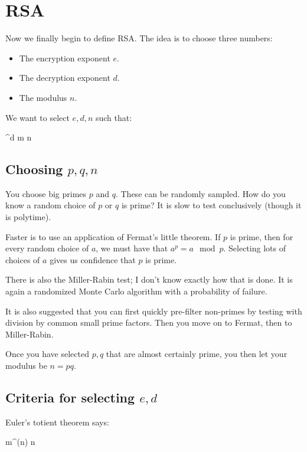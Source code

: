 \section{RSA}

Now we finally begin to define RSA. The idea is to choose three numbers:

\begin{itemize}
  \item
    The encryption exponent $e$.
  \item
    The decryption exponent $d$.
  \item
    The modulus $n$.
\end{itemize}

We want to select $e, d, n$ such that:

\begin{nedqn}
  ^d
\eqcol
  m \mod n
\end{nedqn}

\subsection{Choosing $p, q, n$}

You choose big primes $p$ and $q$. These can be randomly sampled. How do
you know a random choice of $p$ or $q$ is prime? It is slow to test
conclusively (though it is polytime).

Faster is to use an application of Fermat's little theorem. If $p$ is
prime, then for every random choice of $a$, we must have that $a^p = a
\mod p$. Selecting lots of choices of $a$ gives us confidence that $p$
is prime.

There is also the Miller-Rabin test; I don't know exactly how that is
done. It is again a randomized Monte Carlo algorithm with a probability
of failure.

It is also suggested that you can first quickly pre-filter non-primes by
testing with division by common small prime factors. Then you move on to
Fermat, then to Miller-Rabin.

Once you have selected $p, q$ that are almost certainly prime, you
then let your modulus be $n = pq$.

\subsection{Criteria for selecting $e, d$}

Euler's totient theorem says:

\begin{nedqn}
  m^{\varphi(n)}
 \mod n
\end{nedqn}

